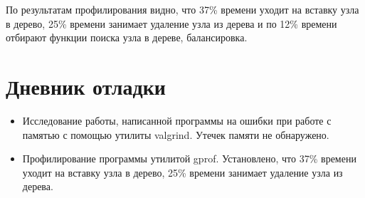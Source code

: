 По результатам профилирования видно, что 37\% времени уходит на вставку узла в дерево, 25\% времени занимает удаление узла из дерева и по 12\% времени отбирают
функции поиска узла в дереве, балансировка.

\pagebreak

\section{Дневник отладки}
\begin{itemize}
\item Исследование работы, написанной программы на ошибки при работе с памятью с помощью утилиты valgrind. Утечек памяти не обнаружено.
\item Профилирование программы утилитой gprof. Установлено, что 37\% времени уходит на вставку узла в дерево, 25\% времени занимает удаление узла из дерева.
\end{itemize}

\newpage